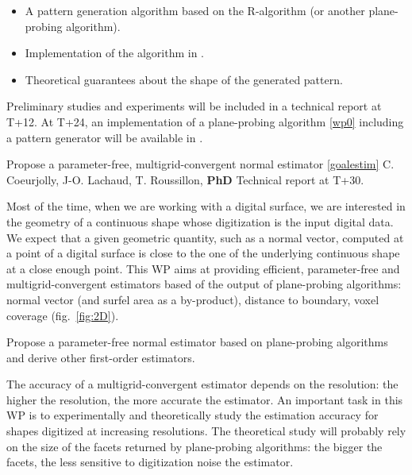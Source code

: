 \Success
\begin{itemize}
  \item A pattern generation algorithm based on the R-algorithm (or another plane-probing algorithm).
  \item Implementation of the algorithm in \DGtal.
  \item Theoretical guarantees about the shape of the generated pattern. 
\end{itemize}

Preliminary studies and experiments will be included in a technical report at T+12.
At T+24, an implementation of a plane-probing algorithm \ref{wp0} including a pattern
generator will be available in \DGtal. 




\medskip
{}
   {Propose a parameter-free, multigrid-convergent normal estimator \ref{goalestim}}
   {C. Coeurjolly, J-O. Lachaud, T. Roussillon, \textbf{PhD}}
   {Technical report at T+30.}
\medskip

 Most of the time, when we are working with a digital surface, we are 
interested in the geometry of a continuous shape whose digitization is the input digital data.
We expect that a given geometric quantity, such as a normal vector, computed at a point of a digital surface
is close to the one of the underlying continuous shape at a close enough point. 
This WP aims at providing efficient, parameter-free and multigrid-convergent estimators based of
the output of plane-probing algorithms: normal vector (and surfel area as a by-product),
distance to boundary, voxel coverage (fig.~\ref{fig:2D}).

\begin{Task}
  \label{task:normal}
  Propose a parameter-free normal estimator based on plane-probing algorithms and
  derive other first-order estimators.  
\end{Task}

The accuracy of a multigrid-convergent estimator depends on the resolution: the higher the resolution,
the more accurate the estimator. An important task in this WP is to experimentally and theoretically
study the estimation accuracy for shapes digitized at increasing resolutions. The theoretical study
will probably rely on the size of the facets returned by plane-probing algorithms: the bigger the facets,
the less sensitive to digitization noise the estimator. 

